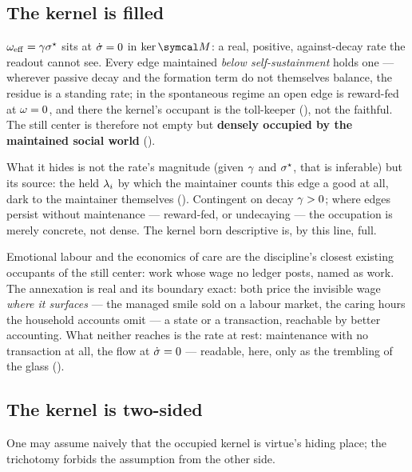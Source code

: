 \documentclass[../main]{subfiles}
\begin{document}
\subsection{The kernel is filled}
\label{subsec:maint:filled}
%
$\omega\sb{\mathrm{eff}}=\gamma\sigma\sp{\star}$ sits at $\dot{\sigma}=0$ in $\ker\readout$: a real, positive,
against-decay rate the readout cannot see. Every edge maintained \emph{below
self-sustainment} holds one --- wherever passive decay and the formation term do not
themselves balance, the residue is a standing rate; in the spontaneous regime an open
edge is reward-fed at $\omega=0$, and there the kernel's occupant is the toll-keeper
(), not the faithful. The still center
is therefore not empty but \textbf{densely occupied by the maintained social world}
().

What it hides is not the rate's magnitude (given $\gamma$ and $\sigma\sp{\star}$, that is inferable)
but its source: the held $\lambda\sb{i}$ by which the maintainer counts this edge a good at
all, dark to the maintainer themselves (). Contingent on decay $\gamma>0$; where edges
persist without maintenance --- reward-fed, or undecaying --- the occupation is merely concrete, not dense. The kernel born
descriptive is, by this line, full.


\begin{econ}[label=e:carework, title={The nearest occupants of the still center}, ref=ten:fid,
  cites={a:hochschild,a:folbre}, departs=wall,
  stopsat={prices the wage where it surfaces --- the labour market, the household accounts; cannot reach the rate at rest, no transaction at all}]
  Emotional labour \parencite{a:hochschild} and the economics of care \parencite{a:folbre}
  are the discipline's closest existing occupants of the still center: work whose wage no
  ledger posts, named as work. The annexation is real and its boundary exact: both price
  the invisible wage \emph{where it surfaces} --- the managed smile sold on a labour
  market, the caring hours the household accounts omit --- a state or a transaction,
  reachable by better accounting. What neither reaches is the rate at rest: maintenance
  with no transaction at all, the flow at $\dot{\sigma}=0$ --- readable, here, only as the
  trembling of the glass ().
\end{econ}

\subsection{The kernel is two-sided}
\label{subsec:maint:twosided}
%
One may assume naively that the occupied kernel is virtue's hiding place; the trichotomy
forbids the assumption from the other side.
\end{document}
